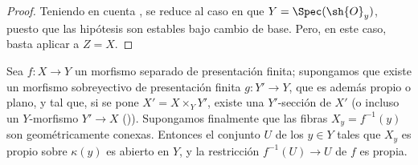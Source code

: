 \begin{proof}
Teniendo en cuenta , se reduce al caso en que $Y=\Spec(\sh{O}_y)$, puesto que las hipótesis son estables bajo cambio de base.
Pero, en este caso, basta aplicar  a $Z=X$.
\end{proof}

\begin{corollary}[15.7.11]
\label{IV.15.7.11}
Sea $f:X\to Y$ un morfismo separado de presentación finita; supongamos que existe un morfismo sobreyectivo de presentación finita $g:Y'\to Y$, que es además propio \textup{o} plano, y tal que, si se pone $X'=X\times_Y Y'$, existe una $Y'$-sección de $X'$ (o incluso un $Y$-morfismo $Y'\to X$ \textup{()}).
Supongamos finalmente que las fibras $X_y=f^{-1}(y)$ son geométricamente conexas.
Entonces el conjunto $U$ de los $y\in Y$ tales que $X_y$ es propio sobre $\kappa(y)$ es abierto en $Y$, y la restricción $f^{-1}(U)\to U$ de $f$ es propia.
\end{corollary}

